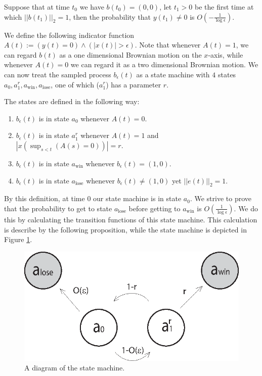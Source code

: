 {\begin{propos}\label{prop:reph}
Suppose that at time $t_0$ we have
${b}(t_0)=(0,0)$, let $t_1>0$ be the first time at which
$||b(t_1)||_2=1$, then the probability that $y(t_1)\neq0$ is
$O\left(-\frac1{\log\epsilon}\right)$.
\end{propos}

We define the following indicator function
$A(t):=(y(t)=0)\wedge(|x(t)|>\epsilon)$. Note that whenever $A(t)=1$,
we can regard $b(t)$ as a one dimensional Brownian motion on the
$x$-axis, while whenever $A(t)=0$ we can regard it as a two
dimensional Brownian motion. We can now treat the sampled
process $b_\epsilon(t)$ as a state machine with $4$ states
$a_0,a^r_1,a_{\text{win}},a_{\text{lose}}$, one of which ($a^r_1$) has a parameter $r$.

The states are defined in the following way:
\begin{enumerate}
\item\label{n1} $b_\epsilon(t)$ is in state $a_0$ whenever $A(t)=0$.
\item\label{n2} $b_\epsilon(t)$ is in state $a^r_1$ whenever $A(t)=1$ and $|x(\sup_{s<t}(A(s)=0))|=r$.
\item\label{n3} $b_\epsilon(t)$ is in state $a_\text{win}$ whenever $b_\epsilon(t)=(1,0)$.
\item\label{n4} $b_\epsilon(t)$ is in state $a_\text{lose}$ whenever $b_\epsilon(t)\neq(1,0)$ yet $||e(t)||_2=1$.
\end{enumerate}

By this definition, at time $0$ our state machine is in state $a_0$.
We strive to prove that the probability to get to
 state $a_\text{lose}$ before getting to $a_\text{win}$ is $O(\frac1{\log\epsilon})$.
 We do this by calculating the transition functions of
 this state machine. This calculation is describe by the following proposition,
 while the state machine is depicted in Figure \ref{fig:state_machine}.

 \begin{figure}[htb]
\begin{center}
\leavevmode
\includegraphics{state_machine.eps}
\end{center}
\caption{A diagram of the state machine.}
\label{fig:state_machine}
\end{figure}

}
